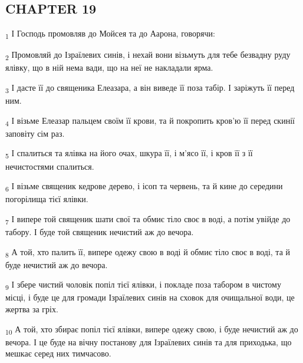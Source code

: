 \subsection{CHAPTER 19}
\begin{tcolorbox}
\textsubscript{1} І Господь промовляв до Мойсея та до Аарона, говорячи:
\end{tcolorbox}
\begin{tcolorbox}
\textsubscript{2} Промовляй до Ізраїлевих синів, і нехай вони візьмуть для тебе безвадну руду ялівку, що в ній нема вади, що на неї не накладали ярма.
\end{tcolorbox}
\begin{tcolorbox}
\textsubscript{3} І дасте її до священика Елеазара, а він виведе її поза табір. І заріжуть її перед ним.
\end{tcolorbox}
\begin{tcolorbox}
\textsubscript{4} І візьме Елеазар пальцем своїм її крови, та й покропить кров'ю її перед скинії заповіту сім раз.
\end{tcolorbox}
\begin{tcolorbox}
\textsubscript{5} І спалиться та ялівка на його очах, шкура її, і м'ясо її, і кров її з її нечистостями спалиться.
\end{tcolorbox}
\begin{tcolorbox}
\textsubscript{6} І візьме священик кедрове дерево, і ісоп та червень, та й кине до середини погорілища тієї ялівки.
\end{tcolorbox}
\begin{tcolorbox}
\textsubscript{7} І випере той священик шати свої та обмиє тіло своє в воді, а потім увійде до табору. І буде той священик нечистий аж до вечора.
\end{tcolorbox}
\begin{tcolorbox}
\textsubscript{8} А той, хто палить її, випере одежу свою в воді й обмиє тіло своє в воді, та й буде нечистий аж до вечора.
\end{tcolorbox}
\begin{tcolorbox}
\textsubscript{9} І збере чистий чоловік попіл тієї ялівки, і покладе поза табором в чистому місці, і буде це для громади Ізраїлевих синів на сховок для очищальної води, це жертва за гріх.
\end{tcolorbox}
\begin{tcolorbox}
\textsubscript{10} А той, хто збирає попіл тієї ялівки, випере одежу свою, і буде нечистий аж до вечора. І це буде на вічну постанову для Ізраїлевих синів та для приходька, що мешкає серед них тимчасово.
\end{tcolorbox}
